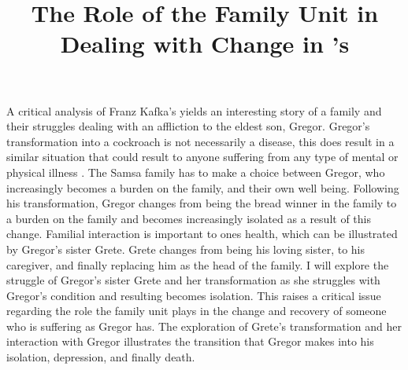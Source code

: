 \documentclass{article}
\title{The Role of the Family Unit in Dealing with Change in
\citeauthor{kafka2007meta}'s \citetitle{kafka2007meta}}
\begin{document}
\makeheader




A critical analysis of Franz Kafka's  yields an
interesting story of a family and their struggles dealing with an affliction
to the eldest son, Gregor. Gregor's transformation into a cockroach is not
necessarily a disease, this does result in a similar situation that could
result to anyone suffering from any type of mental or physical illness
\cite[267]{rowe2002}. The Samsa family has to make a choice between Gregor,
who increasingly becomes a burden on the family, and their own well being.
Following his transformation, Gregor changes from being the bread winner in
the family to a burden on the family and becomes increasingly isolated as a
result of this change. Familial interaction is important to ones health,
which can be illustrated by Gregor's sister Grete. Grete changes from being
his loving sister, to his caregiver, and finally replacing him as the head
of the family. I will explore the struggle of Gregor's sister Grete and her
transformation as she struggles with Gregor's condition and resulting
becomes isolation. This raises a critical issue regarding the role the
family unit plays in the change and recovery of someone who is suffering as
Gregor has. The exploration of Grete's transformation and her interaction
with Gregor illustrates the transition that Gregor makes into his isolation,
depression, and finally death.
\end{document}
